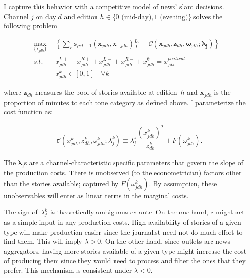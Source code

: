 \documentclass[12pt]{article}
\begin{document}
I capture this behavior with a competitive model of news' slant decisions. Channel $j$ on day $d$ and edition $h\in\{0\text{ (mid-day)},1\text{ (evening)}\}$ solves the following problem:



\begin{equation}\label{eq:payoffs}
	\begin{aligned}
		\max_{\{\mathbf{x}_{jdh}\}}   & \left\{   \sum_{r}\bm{s}_{jrd+1}(\bm{x}_{jdh}, \bm{x}_{-jdh})\frac{L_r}{L} -  \mathcal{C}\left(  \bm{x}_{jdh},\bm{z}_{dh}, \bm{\omega}_{jdh}; \bm{\lambda_j}   \right)    \right\}\\
		s.t.   \quad &   x_{jdh}^{L+} +x_{jdh}^{R+} + x_{jdh}^{L-} + x_{jdh}^{R-} + x_{jdh}^{\emptyset} = x_{jdh}^{political}\\
		& x_{jdh}^k \in [0,1] \quad \forall k
	\end{aligned}
\end{equation} 






where $\bm z_{dh}$ measures the pool of stories available at edition~$h$ and $\bm x_{jdh}$ is the proportion of minutes to each tone category as defined above. 
I parameterize the cost function as:

\begin{equation*}\label{}
	\begin{aligned}
		& \mathcal{C}(x_{jdh}^k,z_{dh}^k,\omega^k_{jdh}; \lambda_j^k )\equiv   \lambda_j^k  \dfrac{(x_{jdh}^k)^2}{z_{dh}^k} + F(\omega^k_{jdh}).
	\end{aligned}
\end{equation*} 

 The $\bm{\lambda_j}$s are a channel-characteristic specific parameters that govern the slope of the production costs. There is unobserved (to the econometrician)  factors other than the stories available; captured by $ F(\omega^k_{jdh})$. By assumption, these unobservables will enter as linear terms in the marginal costs. 

The sign of~$\lambda_j^k$
is theoretically ambiguous ex-ante. On the one hand, $z$ might act as a simple input in any production costs. High availability of stories of a given type will make production easier since the journalist need not do much effort to find them. This will imply $ \lambda>0$. On the other hand, since outlets are news aggregators, having more stories available of a given type might increase the cost of producing them since they would need to process and filter the ones that they prefer. This mechanism is consistent under $ \lambda<0$.
\end{document}
